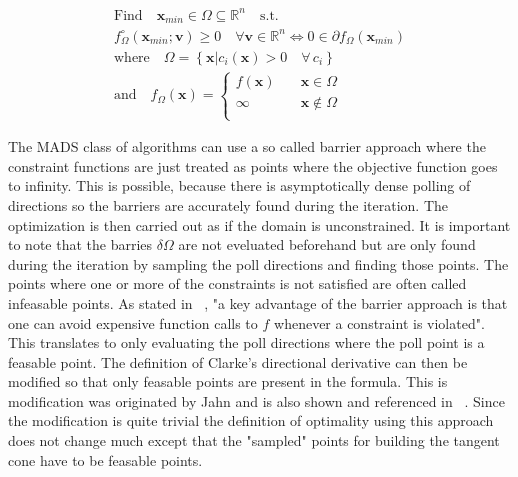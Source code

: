 \documentclass[a4paper,10pt]{article}
\renewcommand{\vec}[1]{\mathbf{#1}}
\begin{document}
    \begin{equation}
    \label{equ:optimality_mads}
        \begin{gathered}
        \text{Find} \quad \vec{x}_{min} \in \Omega \subseteq \mathbb{R}^n \quad \text{s.t.}\\
        f_{\Omega}^{\circ}(\vec{x}_{min}; \vec{v}) \geq 0 \quad \forall
             \vec{v} \in \mathbb{R}^n
            \Longleftrightarrow
            0 \in \partial f_{\Omega}(\vec{x}_{min})\\
        \text{where} \quad \Omega = \left \{  \vec{x} \vert  c_i(\vec{x}) > 0 \quad \forall \, c_i \right \}\\
        \text{and} \quad f_{\Omega}(\vec{x}) = 
        \begin{cases}
            f(\vec{x}) & \quad \vec{x} \in \Omega \\
            \infty & \quad \vec{x} \notin \Omega \\
        \end{cases}
        \end{gathered}
    \end{equation}

    The MADS class of algorithms can use a so called barrier approach where the
    constraint functions are just treated as points where the objective function
    goes to infinity.
    This is possible, because there is asymptotically dense polling of directions
    so the barriers are accurately found during the iteration.
    The optimization is then carried out as if the domain is unconstrained.
    It is important to note that the barries $\delta\Omega$ are not 
    eveluated beforehand but are only found during the iteration by
    sampling the poll directions and finding those points.
    The points where one or more of the constraints is not satisfied are often called
    infeasable points.
    As stated in ~\cite{mads_original}, "a key advantage of the barrier
    approach is that one can avoid expensive function calls to $f$ whenever
    a constraint is violated".
    This translates to only evaluating the poll directions where the
    poll point is a feasable point.
    The definition of Clarke's directional derivative can then be modified
    so that only feasable points are present in the formula.
    This is modification was originated by Jahn and is also shown
    and referenced in ~\cite{mads_original}.
    Since the modification is quite trivial the definition of optimality
    using this approach does not change much except that the
    "sampled" points for building the tangent cone have to be feasable
    points.  
\end{document}
